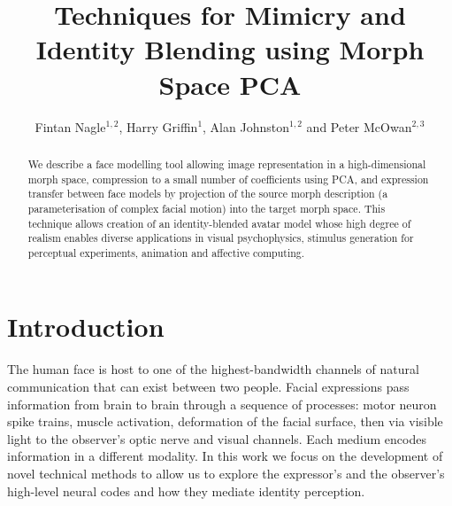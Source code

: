 \documentclass[runningheads]{llncs}
\begin{document}
\newcommand{\point}{
    \raise0.7ex\hbox{.}
    }


\pagestyle{headings}

\mainmatter

\title{Techniques for Mimicry and Identity Blending using Morph Space PCA} %



\author{Fintan Nagle$^{1,2}$, Harry Griffin$^1$, Alan Johnston$^{1,2}$ and Peter McOwan$^{2,3}$} %

\maketitle

\begin{abstract}
We describe a face modelling tool allowing image representation in a high-dimensional morph space, compression to a small number of coefficients using PCA\cite{jolliffe2002principal}, and expression transfer between face models by projection of the source morph description (a parameterisation of complex facial motion) into the target morph space. This technique allows creation of an identity-blended avatar model whose high degree of realism enables diverse applications in visual psychophysics, stimulus generation for perceptual experiments, animation and affective computing.
\end{abstract}

\section{Introduction}

The human face is host to one of the highest-bandwidth channels of natural communication that can exist between two people. Facial expressions pass information from brain to brain through a sequence of processes: motor neuron spike trains, muscle activation, deformation of the facial surface, then via visible light to the observer's optic nerve and visual channels. Each medium encodes information in a different modality. In this work we focus on the development of novel technical methods to allow us to explore the expressor's and the observer's high-level neural codes and how they mediate identity perception.
\end{document}

